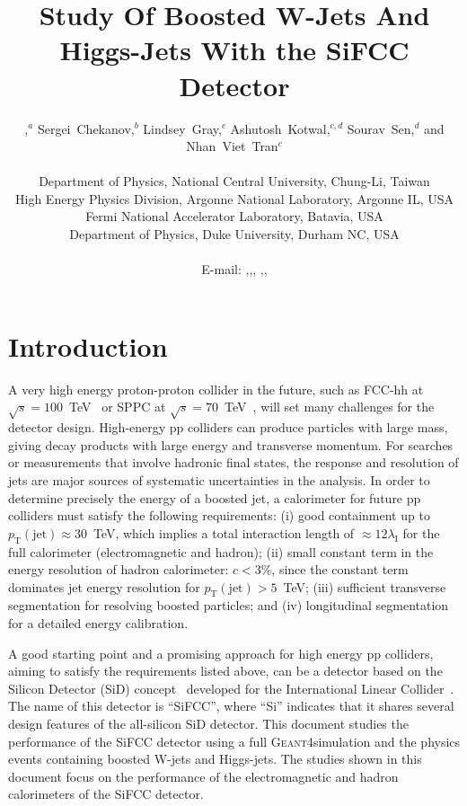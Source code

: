 \documentclass{PoS}
\title{Study Of Boosted W-Jets And Higgs-Jets With the SiFCC Detector}
\author{\speaker{Shin-Shan~Yu},$^{a}$ Sergei~Chekanov,$^{b}$ Lindsey~Gray,$^{c}$ Ashutosh~Kotwal,$^{c,d}$ Sourav~Sen,$^{d}$ and Nhan~Viet~Tran$^{c}$\\ \\
        \llap{$^a$}Department of Physics, National Central University, Chung-Li, Taiwan\\
        \llap{$^b$}High Energy Physics Division, Argonne National Laboratory, Argonne IL, USA\\
        \llap{$^c$}Fermi National Accelerator Laboratory, Batavia, USA\\
        \llap{$^d$}Department of Physics, Duke University, Durham NC, USA\\\\
        E-mail: \email{syu@cern.ch},\email{chekanov@anl.gov},\email{lagray@fnal.gov},
        \email{kotwal@phy.duke.edu},\email{ss567@phy.duke.edu},\email{ntran@fnal.gov}}
\newcommand{\ptj}{\ensuremath{p_{\mathrm{T}}(\mathrm{jet})}}
\newcommand{\GEANTfour} {{\textsc{Geant4}}}
\begin{document}
\section{Introduction}
A very high energy proton-proton collider in the future, such as FCC-hh 
at $\sqrt{s}=100$~TeV~\cite{FCC-hh} or 
SPPC at $\sqrt{s}=70$~TeV~\cite{SPPC-one,SPPC-two,SPPC-three}, 
will set many challenges for the detector design. High-energy pp colliders 
can produce particles with large mass, giving decay products with large energy 
and transverse momentum. For searches or measurements that involve hadronic 
final states, the response and resolution of jets are major sources of 
systematic uncertainties in the analysis. 
In order to determine precisely the energy of a 
boosted jet, a calorimeter for future pp colliders must satisfy the following 
requirements: (i)
 good containment up to $\ptj\approx 30$~TeV, which implies a total 
 interaction length of $\approx 12 \lambda_\mathrm{I}$ for the full 
 calorimeter (electromagnetic and hadron); 
 (ii) small constant term in the energy resolution of hadron calorimeter: 
$c < 3\%$, since the constant term dominates jet energy resolution for 
$\ptj>5$~TeV;
 (iii) sufficient transverse segmentation for resolving boosted particles;
 and (iv) longitudinal segmentation for a detailed energy calibration.

A good starting point and a promising approach for high energy pp colliders, 
aiming to satisfy the requirements listed above, 
can be a detector based on the Silicon Detector (SiD) concept~\cite{sid} 
developed for the International Linear Collider~\cite{ILCone,ILCtwo}. The 
name of this detector is ``SiFCC'', where ``Si'' indicates that it 
shares several design features of the all-silicon SiD detector. 
%
This document studies the performance of the SiFCC detector using 
a full \GEANTfour simulation and the physics events containing 
boosted W-jets and Higgs-jets. The studies shown in this document 
focus on the performance of the electromagnetic and hadron calorimeters
 of the SiFCC detector.
\end{document}
